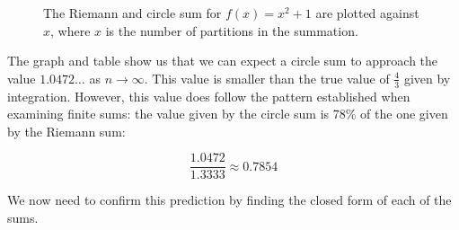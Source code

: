 \documentclass{article}
\begin{document}
      \begin{figure}[h]
        \centering
        \caption{The Riemann and circle sum for \( f(x) = x^2+1 \) are plotted against \( x \), where \( x \) is the number of partitions in the summation.}
      \end{figure}
      \begin{center}
      \end{center}

      The graph and table show us that we can expect a circle sum to approach the value \( 1.0472\dots \) as \( n \to \infty \). This value is smaller than the true value of \( \frac{4}{3} \) given by integration. However, this value does follow the pattern established when examining finite sums: the value given by the circle sum is 78\% of the one given by the Riemann sum:

      \[ \frac{1.0472}{1.3333} \approx 0.7854 \]

      We now need to confirm this prediction by finding the closed form of each of the sums.
\end{document}
